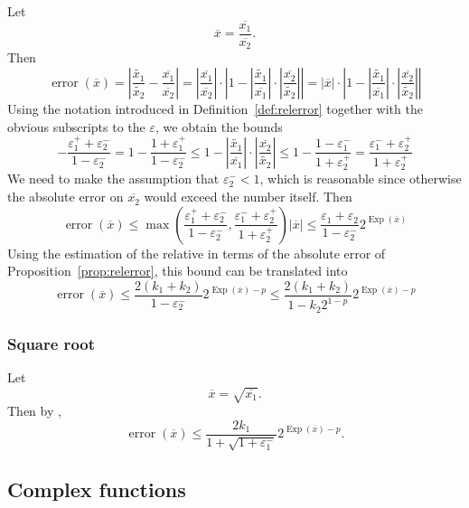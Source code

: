 \documentclass {article}
\newcommand {\corr}[1]{\widetilde {#1}}
\newcommand {\appro}[1]{\overline {#1}}
\DeclareMathOperator{\Exp}{\operatorname {Exp}}
\newcommand{\error}{\operatorname {error}}
\renewcommand {\epsilon}{\varepsilon}
\renewcommand {\leq}{\leqslant}
\begin{document}
Let
\[
\appro x = \frac {\appro {x_1}}{\appro {x_2}}.
\]
Then
\[
\error (\appro x) = \left|
\frac {\corr {x_1}}{\corr {x_2}} - \frac {\appro {x_1}}{\appro {x_2}} \right|
= \left| \frac {\appro {x_1}}{\appro {x_2}} \right|
\cdot \left|
1 - \left| \frac {\corr {x_1}}{\appro {x_1}} \right|
   \cdot \left| \frac {\appro {x_2}}{\corr {x_2}} \right|
\right|
= | \appro x |
\cdot \left|
1 - \left| \frac {\corr {x_1}}{\appro {x_1}} \right|
   \cdot \left| \frac {\appro {x_2}}{\corr {x_2}} \right|
\right|
\]
Using the notation introduced in Definition~\ref {def:relerror} together
with the obvious subscripts to the $\epsilon$, we obtain the bounds
\[
- \frac {\epsilon_1^+ + \epsilon_2^-}{1 - \epsilon_2^-}
=
1 - \frac {1 + \epsilon_1^+}{1 - \epsilon_2^-}
\leq
1 - \left| \frac {\corr {x_1}}{\appro {x_1}} \right|
   \cdot \left| \frac {\appro {x_2}}{\corr {x_2}} \right|
\leq
1 - \frac {1 - \epsilon_1^-}{1 + \epsilon_2^+}
=
\frac {\epsilon_1^- + \epsilon_2^+}{1 + \epsilon_2^+}
\]
We need to make the assumption that $\epsilon_2^- < 1$, which is reasonable
since otherwise the absolute error on $\appro {x_2}$ would exceed the number
itself. Then
\[
\error (\appro x)
\leq
\max \left(
   \frac {\epsilon_1^+ + \epsilon_2^-}{1 - \epsilon_2^-},
   \frac {\epsilon_1^- + \epsilon_2^+}{1 + \epsilon_2^+}
\right) |\appro x|
\leq
\frac {\epsilon_1 + \epsilon_2}{1 - \epsilon_2^-} 2^{\Exp (\appro x)}
\]
Using the estimation of the relative in terms of the absolute error of
Proposition~\ref {prop:relerror}, this bound can be translated into
\begin {equation}
\label {eq:proprealdiv}
\error (\appro x)
\leq
\frac {2 (k_1 + k_2)}{1 - \epsilon_2^-} 2^{\Exp (\appro x) - p}
\leq
\frac {2 (k_1 + k_2)}{1 - k_2 2^{1 - p}} 2^{\Exp (\appro x) - p}
\end {equation}


\subsubsection {Square root}
\label {sssec:proprealsqrt}

Let
\[
\appro x = \sqrt {\appro {x_1}}.
\]
Then by \cite[\S1.7]{MPFRAlgorithms},
\begin {equation}
\label {eq:proprealsqrt}
\error (\appro x)
\leq
\frac {2 k_1}{1 + \sqrt {1 + \epsilon_1^-}} 2^{\Exp (\appro x) - p}.
\end {equation}



\subsection {Complex functions}
\end{document}
